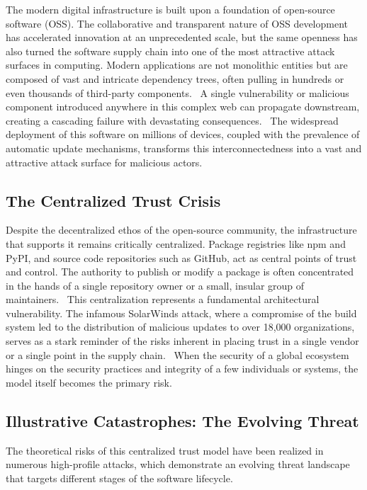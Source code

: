 \documentclass{article}
\begin{document}
The modern digital infrastructure is built upon a foundation of open-source software (OSS). The collaborative and transparent nature of OSS development has accelerated innovation at an unprecedented scale, but the same openness has also turned the software supply chain into one of the most attractive attack surfaces in computing. Modern applications are not monolithic entities but are composed of vast and intricate dependency trees, often pulling in hundreds or even thousands of third-party components.~\cite{ohm2020backstabber} A single vulnerability or malicious component introduced anywhere in this complex web can propagate downstream, creating a cascading failure with devastating consequences.~\cite{ladisa2023sok} The widespread deployment of this software on millions of devices, coupled with the prevalence of automatic update mechanisms, transforms this interconnectedness into a vast and attractive attack surface for malicious actors.~\cite{nhtsa2020firmware}

\subsection{The Centralized Trust Crisis}

Despite the decentralized ethos of the open-source community, the infrastructure that supports it remains critically centralized. Package registries like npm and PyPI, and source code repositories such as GitHub, act as central points of trust and control. The authority to publish or modify a package is often concentrated in the hands of a single repository owner or a small, insular group of maintainers.~\cite{aikido2025rand} This centralization represents a fundamental architectural vulnerability. The infamous SolarWinds attack, where a compromise of the build system led to the distribution of malicious updates to over 18,000 organizations, serves as a stark reminder of the risks inherent in placing trust in a single vendor or a single point in the supply chain.~\cite{cisa2020solarwinds} When the security of a global ecosystem hinges on the security practices and integrity of a few individuals or systems, the model itself becomes the primary risk.

\subsection{Illustrative Catastrophes: The Evolving Threat}

The theoretical risks of this centralized trust model have been realized in numerous high-profile attacks, which demonstrate an evolving threat landscape that targets different stages of the software lifecycle.
\end{document}
